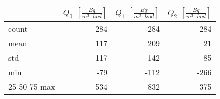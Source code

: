 \begin{tabular}{lrrr}
\toprule
{} &  $Q_0$ $\left[\si{\frac{Bq}{m^3\cdot hod}}\right]$ &  $Q_1$ $\left[\si{\frac{Bq}{m^3\cdot hod}}\right]$ &  $Q_2$ $\left[\si{\frac{Bq}{m^3\cdot hod}}\right]$ \\
\midrule
count &                                                284 &                                                284 &                                                284 \\
mean  &                                                117 &                                                209 &                                                 21 \\
std   &                                                117 &                                                142 &                                                 85 \\
min   &                                                -79 &                                               -112 &                                               -266 \\
25%
50%
75%
max   &                                                534 &                                                832 &                                                375 \\
\bottomrule
\end{tabular}
